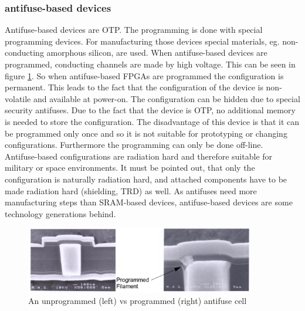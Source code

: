 \subsubsection{antifuse-based devices}
Antifuse-based devices are OTP. The programming is done with special programming devices. For manufacturing those devices special materials, eg. non-conducting amorphous silicon, are used.\cite{Zeif2011} When antifuse-based devices are programmed, conducting channels are made by high voltage. This can be seen in figure \ref{fig:antifusevorhernachher}. So when antifuse-based FPGAs are programmed the configuration is permanent. This leads to the fact that the configuration of the device is non-volatile and available at power-on. The configuration can be hidden due to special security antifuses. Due to the fact that the device is OTP, no additional memory is needed to store the configuration. The disadvantage of this device is that it can be programmed only once and so it is not suitable for prototyping or changing configurations. Furthermore the programming can only be done off-line.\\
Antifuse-based configurations are radiation hard and therefore suitable for military or space environments.\cite{Maxfield2009} It must be pointed out, that only the configuration is naturally radiation hard, and attached components have to be made radiation hard (shielding, TRD) as well. As antifuses need more manufacturing steps than SRAM-based devices, antifuse-based devices are some technology generations behind.
\begin{figure}[htbp]
\begin{center}
\includegraphics[width=10cm,keepaspectratio=true]{bilder/png/antifusevorhernachher}
\caption{An unprogrammed (left) vs programmed (right) antifuse cell \cite{Qui16}}
\label{fig:antifusevorhernachher}
\end{center}
\end{figure}

